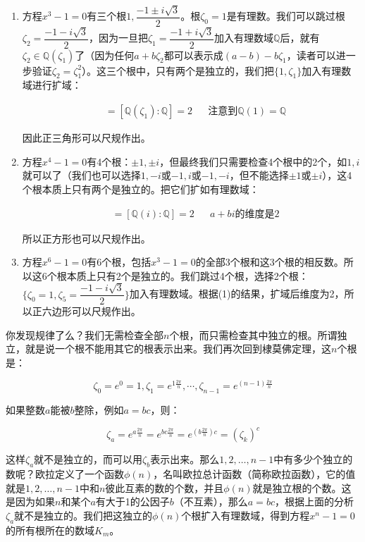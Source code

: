 \begin{enumerate}[(1)]
\item 方程$x^3 - 1 = 0$有三个根$1, \dfrac{-1 \pm i\sqrt{3}}{2}$。根$\zeta_0 = 1$是有理数。我们可以跳过根$\zeta_2 = \dfrac{-1 - i\sqrt{3}}{2}$，因为一旦把$\zeta_1 = \dfrac{-1 + i\sqrt{3}}{2}$加入有理数域$\mathbb{Q}$后，就有$\zeta_2 \in \mathbb{Q}(\zeta_1)$了（因为任何$a + b \zeta_2$都可以表示成$(a - b) - b \zeta_1$，读者可以进一步验证$\zeta_2 = \zeta_1^2$）。这三个根中，只有两个是独立的，我们把$\{1, \zeta_1\}$加入有理数域进行扩域：

\begin{align*}
[\mathbb{Q}(1, \zeta_1) : \mathbb{Q}] &= [\mathbb{Q}(\zeta_1) : \mathbb{Q}] = 2  && \text{注意到}\mathbb{Q}(1) = \mathbb{Q}
\end{align*}

因此正三角形可以尺规作出。

\item 方程$x^4 - 1 = 0$有4个根：$\pm 1, \pm i$，但最终我们只需要检查4个根中的2个，如$1, i$就可以了（我们也可以选择$1, -i$或$-1, i$或$-1, -i$，但不能选择$\pm 1$或$\pm i$），这4个根本质上只有两个是独立的。把它们扩如有理数域：

\begin{align*}
[\mathbb{Q}(1, i) : \mathbb{Q}] &= [\mathbb{Q}(i) : \mathbb{Q}] = 2 && a + bi\text{的维度是2}
\end{align*}

所以正方形也可以尺规作出。

\item 方程$x^6 - 1 = 0$有6个根，包括$x^3 - 1 = 0$的全部3个根和这3个根的相反数。所以这6个根本质上只有2个是独立的。我们跳过4个根，选择2个根：$\{\zeta_0 = 1, \zeta_5 = \dfrac{-1 - i\sqrt{3}}{2}\}$加入有理数域。根据(1)的结果，扩域后维度为2，所以正六边形可以尺规作出。
\end{enumerate}

你发现规律了么？我们无需检查全部$n$个根，而只需检查其中独立的根。所谓独立，就是说一个根不能用其它的根表示出来。我们再次回到棣莫佛定理，这$n$个根是：

\[
\zeta_0 = e^0 = 1, \zeta_1 = e^{1\frac{2\pi}{n}}, \dotsb, \zeta_{n-1} = e^{(n - 1)\frac{2\pi}{n}}
\]

如果整数$a$能被$b$整除，例如$a = bc$，则：

\[
\zeta_a = e^{a\frac{2\pi}{n}} = e^{bc\frac{2\pi}{n}} = e^{(b\frac{2\pi}{n})c} = (\zeta_k)^c
\]

这样$\zeta_a$就不是独立的，而可以用$\zeta_b$表示出来。那么$1, 2, \dotsc, n-1$中有多少个独立的数呢？欧拉定义了一个函数$\phi(n)$，名叫欧拉总计函数（简称欧拉函数），它的值就是$1, 2, \dotsc, n-1$中和$n$彼此互素的数的个数，并且$\phi(n)$就是独立根的个数。这是因为如果$n$和某个$a$有大于1的公因子$b$（不互素），那么$a = bc$，根据上面的分析$\zeta_a$就不是独立的。我们把这独立的$\phi(n)$个根扩入有理数域，得到方程$x^n -1 = 0$的所有根所在的数域$K_m$。

